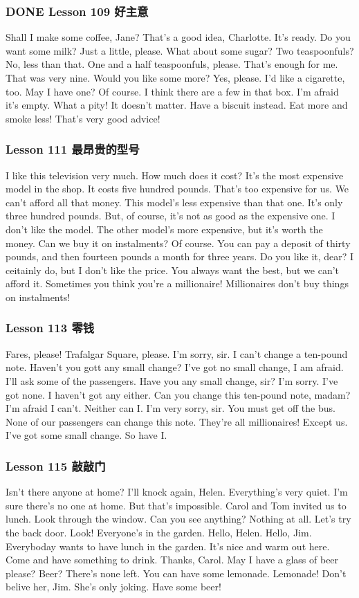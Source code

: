 \documentclass[11pt]{ctexart}
\begin{document}
\subsubsection{{\bfseries\sffamily DONE} Lesson 109 好主意}
\label{sec:orgee6f80f}
Shall I make some coffee, Jane?
That's a good idea, Charlotte.
It's ready.
Do you want some milk?
Just a little, please.
What about some sugar?
Two teaspoonfuls?
No, less than that.
One and a half teaspoonfuls, please.
That's enough for me.
That was very nine.
Would you like some more?
Yes, please.
I'd like a cigarette, too.
May I have one?
Of course.
I think there are a few in that box.
I'm afraid it's empty.
What a pity!
It doesn't matter.
Have a biscuit instead.
Eat more and smoke less!
That's very good advice!
\subsubsection{Lesson 111 最昂贵的型号}
\label{sec:org381bd45}
I like this television very much.
How much does it cost?
It's the most expensive model in the shop.
It costs five hundred pounds.
That's too expensive for us.
We can't afford all that money.
This model's less expensive than that one.
It's only three hundred pounds.
But, of course, it's not as good as the expensive one.
I don't like the model.
The other model's more expensive,
but it's worth the money.
Can we buy it on instalments?
Of course. You can pay a deposit of thirty pounds,
and then fourteen pounds a month for three years.
Do you like it, dear?
I ceitainly do,
but I don't like the price.
You always want the best,
but we can't afford it.
Sometimes you think you're a millionaire!
Millionaires don't buy things on instalments!
\subsubsection{Lesson 113 零钱}
\label{sec:orge654f67}
Fares, please!
Trafalgar Square, please.
I'm sorry, sir. I can't change a ten-pound note.
Haven't you gott any small change?
I've got no small change, I am afraid.
I'll ask some of the passengers.
Have you any small change, sir?
I'm sorry. I've got none.
I haven't got any either.
Can you change this ten-pound note, madam?
I'm afraid I can't.
Neither can I.
I'm very sorry, sir.
You must get off the bus.
None of our passengers can change this note.
They're all millionaires!
Except us.
I've got some small change.
So have I.
\subsubsection{Lesson 115 敲敲门}
\label{sec:orgf88ceef}
Isn't there anyone at home?
I'll knock again, Helen.
Everything's very quiet.
I'm sure there's no one at home.
But that's impossible.
Carol and Tom invited us to lunch.
Look through the window.
Can you see anything?
Nothing at all.
Let's try the back door.
Look! Everyone's in the garden.
Hello, Helen. Hello, Jim.
Everyboday wants to have lunch in the garden.
It's nice and warm out here.
Come and have something to drink.
Thanks, Carol.
May I have a glass of beer please?
Beer?
There's none left.
You can have some lemonade.
Lemonade!
Don't belive her, Jim. She's only joking.
Have some beer!
\end{document}
